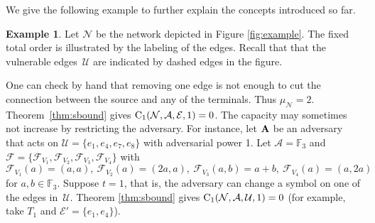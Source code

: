 \documentclass[11pt,a4paper]{article}
\theoremstyle{definition}
\newtheorem{example}[theorem]{Example}
\newcommand{\numberset}{\mathds}
\newcommand{\F}{\numberset{F}}
\newcommand{\mA}{\mathcal{A}}
\newcommand{\mN}{\mathcal{N}}
\newcommand{\mF}{\mathcal{F}}
\newcommand{\mU}{\mathcal{U}}
\newcommand{\mE}{\mathcal{E}}
\newcommand{\CC}{\textnormal{C}}
\newcommand{\adv}{\textnormal{\textbf{A}}}
\begin{document}
We give the following example to further explain the concepts introduced so far.




\begin{example}
\label{ex:intro}
Let $\mN$ be the network depicted in Figure \ref{fig:example}. The fixed total order is illustrated by the labeling of the edges. Recall that that the vulnerable edges~$\mU$ are indicated by dashed edges in the figure. 

One can check by hand that removing one edge is not enough to cut the connection between the source and any of the terminals. Thus $\mu_{\mN}=2$. 
Theorem~\ref{thm:sbound}
gives $\CC_1(\mN,\mA,\mE,1)=0$. The capacity may sometimes not increase by 
restricting the adversary. For instance, let $\adv$ be an adversary that acts on $\mU=\{e_1,e_4,e_7,e_8\}$ with adversarial power 1.  Let $\mA = \F_3$ and~$\mF = \{\mF_{V_1},\mF_{V_2},\mF_{V_3},\mF_{V_4}\}$ with 
$$\mF_{V_1}(a) = (a,a),\ \mF_{V_2}(a) = (2a,a),\ \mF_{V_3}(a,b) = a+b,\ \mF_{V_4}(a) = (a,2a)$$ for $a,b \in \F_3$. Suppose $t=1$, that is, the adversary can change a symbol on one of the edges in~$\mU$. Theorem \ref{thm:sbound} gives $\CC_1(\mN,\mA,\mU,1)=0$ (for example, take $T_1$ and $\mE'=\{e_1,e_4\}$). 

\end{example} 
\end{document}
